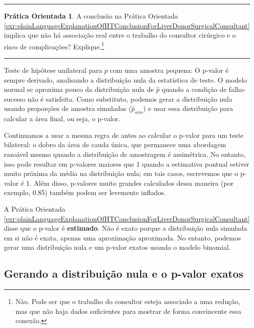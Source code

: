 \documentclass[
]{book}
\theoremstyle{definition}
\theoremstyle{definition}
\theoremstyle{definition}
\newtheorem{exercise}{Prática Orientada}[chapter]
\theoremstyle{definition}
\theoremstyle{remark}
\begin{document}
\begin{center}\rule{0.5\linewidth}{0.5pt}\end{center}

\begin{exercise}
\protect\hypertarget{exr:unnamed-chunk-260}{}{\label{exr:unnamed-chunk-260} }A conclusão na Prática Orientada \ref{exr:plainLanguageExplanationOfHTConclusionForLiverDonorSurgicalConsultant} implica que não há associação real entre o trabalho do consultor cirúrgico e o risco de complicações? Explique.\footnote{Não. Pode ser que o trabalho do consultor esteja associado a uma redução, mas que não haja dados suficientes para mostrar de forma convincente essa conexão.}
\end{exercise}

\begin{center}\rule{0.5\linewidth}{0.5pt}\end{center}

Teste de hipótese unilateral para \(p\) com uma amostra pequena: O p-valor é sempre derivado, analisando a distribuição nula da estatística de teste. O modelo normal se aproxima pouco da distribuição nula de \(\hat{p}\) quando a condição de falha-sucesso não é satisfeita. Como substituto, podemos gerar a distribuição nula usando proporções de amostra simuladas (\(\hat{p}_{sim}\)) e usar essa distribuição para calcular a área final, ou seja, o p-valor.

Continuamos a usar a mesma regra de antes ao calcular o p-valor para um teste bilateral: o dobro da área de cauda única, que permanece uma abordagem razoável mesmo quando a distribuição de amostragem é assimétrica. No entanto, isso pode resultar em p-valores maiores que 1 quando a estimativa pontual estiver muito próxima da média na distribuição nula; em tais casos, escrevemos que o p-valor é 1. Além disso, p-valores muito grandes calculados dessa maneira (por exemplo, 0.85) também podem ser levemente inflados.

A Prática Orientada \ref{exr:plainLanguageExplanationOfHTConclusionForLiverDonorSurgicalConsultant} disse que o p-valor é \textbf{estimado}. Não é exato porque a distribuição nula simulada em si não é exata, apenas uma aproximação aproximada. No entanto, podemos gerar uma distribuição nula e um p-valor exatos usando o modelo binomial.

\hypertarget{exactNullDistributionUsingBinomialModel}{%
\subsection{Gerando a distribuição nula e o p-valor exatos}\label{exactNullDistributionUsingBinomialModel}}
\end{document}
